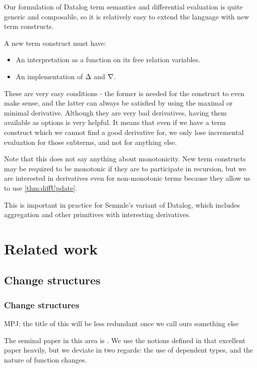 Our formulation of Datalog term semantics and differential evaluation is quite
generic and composable, so it is relatively easy to extend the language with new
term constructs.

A new term construct must have:
\begin{itemize}
  \item An interpretation as a function on its free relation variables.
  \item An implementation of $\Delta$ and $\nabla$.
\end{itemize}

These are very easy conditions - the former is needed for the construct to even
make sense, and the latter can always be satisfied by using the maximal or
minimal derivative. Although they are very bad derivatives, having them
available as options is very helpful. It means that even if we have a term
construct which we cannot find a good derivative for, we only lose incremental
evaluation for those subterms, and not for anything else.

Note that this does not say anything about monotonicity. New term constructs may
be required to be monotonic if they are to participate in recursion, but we are
interested in derivatives even for non-monotonic terms because they allow us to
use \cref{thm:diffUpdate}.

This is important in practice for Semmle's variant of Datalog, which includes
aggregation and other primitives with interesting derivatives.

\section{Related work}

\subsection{Change structures}

\subsubsection{Change structures}

MPJ: the title of this will be less redundant once we call ours something else

The seminal paper in this area is \textcite{cai2014changes}. We use the notions
defined in that excellent paper heavily, but we deviate in two regards: the use of
dependent types, and the nature of function changes.

